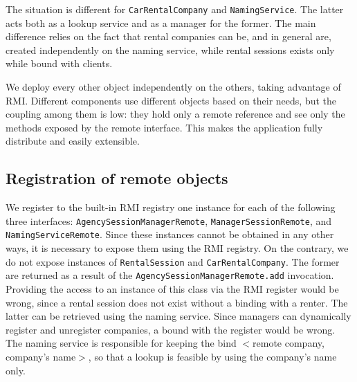 The situation is different for \texttt{CarRentalCompany} and \texttt{NamingService}. The latter acts both as a lookup service and as a manager for the former. The main difference relies on the fact that rental companies can be, and in general are, created independently on the naming service, while rental sessions exists only while bound with clients. 

We deploy every other object independently on the others, taking advantage of RMI. Different components use different objects based on their needs, but the coupling among them is low: they hold only a remote reference and see only the methods exposed by the remote interface. This makes the application fully distribute and easily extensible. 

\subsection{Registration of remote objects}
We register to the built-in RMI registry one instance for each of the following three interfaces: \texttt{AgencySessionManagerRemote}, \texttt{ManagerSessionRemote}, and \texttt{NamingServiceRemote}. Since these instances cannot be obtained in any other ways, it is necessary to expose them using the RMI registry. On the contrary, we do not expose instances of \texttt{RentalSession} and \texttt{CarRentalCompany}. The former are returned as a result of the \texttt{AgencySessionManagerRemote.add} invocation. Providing the access to an instance of this class via the RMI register would be wrong, since a rental session does not exist without a binding with a renter. The latter can be retrieved using the naming service.
Since managers can dynamically register and unregister companies, a bound with the register would be wrong. The naming service is responsible for keeping the bind $<$remote company, company's name$>$, so that a lookup is feasible by using the company's name only.

